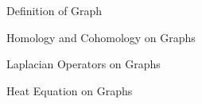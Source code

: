 \documentclass[../main.tex]{subfiles}
\begin{document}
    \begin{section}{Definition of Graph}
           
    \end{section}
    \begin{section}{Homology and Cohomology on Graphs}
        
    \end{section}
    \begin{section}{Laplacian Operators on Graphs}
        
    \end{section}
    \begin{section}{Heat Equation on Graphs}
        
    \end{section}
\end{document}
